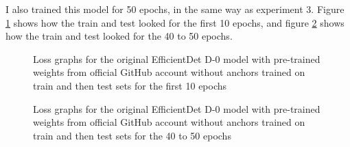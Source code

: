 I also trained this model for 50 epochs, in the same way as experiment 3. Figure \ref{fig:fig12} shows how the train and test looked for the first 10 epochs, and figure \ref{fig:fig14} shows how the train and test looked for the 40 to 50 epochs.

\begin{figure}[!ht]
    \label{fig:fig12}
    \caption{Loss graphs for the original EfficientDet D-0 model with pre-trained weights from official GitHub account without anchors trained on train and then test sets for the first 10 epochs}
\end{figure}

\begin{figure}[H]
    \label{fig:fig14}
    \caption{Loss graphs for the original EfficientDet D-0 model with pre-trained weights from official GitHub account without anchors trained on train and then test sets for the 40 to 50 epochs}
\end{figure}

